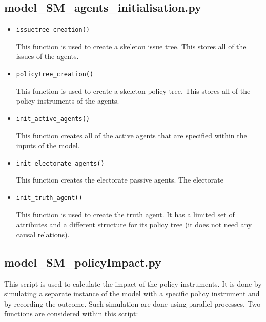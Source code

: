

\subsection{model\_SM\_agents\_initialisation.py}

\begin{itemize}
\item \texttt{issuetree\_creation()}

This function is used to create a skeleton issue tree. This stores all of the issues of the agents.

\item \texttt{policytree\_creation()}

This function is used to create a skeleton policy tree. This stores all of the policy instruments of the agents.

\item \texttt{init\_active\_agents()}

This function creates all of the active agents that are specified within the inputs of the model.

\item \texttt{init\_electorate\_agents()}

This function creates the electorate passive agents. The electorate 

\item \texttt{init\_truth\_agent()}

This function is used to create the truth agent. It has a limited set of attributes and a different structure for its policy tree (it does not need any causal relations).

\end{itemize}



\subsection{model\_SM\_policyImpact.py}

This script is used to calculate the impact of the policy instruments. It is done by simulating a separate instance of the model with a specific policy instrument and by recording the outcome. Such simulation are done using parallel processes. Two functions are considered within this script:

